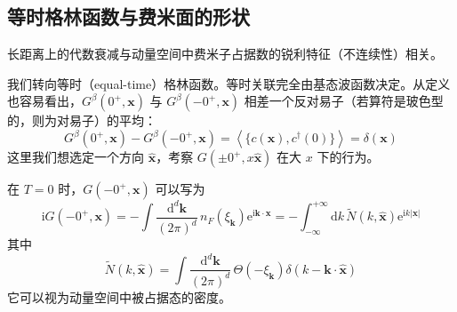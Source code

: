 \subsection{等时格林函数与费米面的形状}

\begin{keypoints}
\item 长距离上的代数衰减与动量空间中费米子占据数的锐利特征（不连续性）相关。
\end{keypoints}

我们转向等时（equal-time）格林函数。等时关联完全由基态波函数决定。从定义也容易看出，$G^{\beta}(0^{+},\pmb{x})$ 与 $G^{\beta}(-0^{+},\pmb{x})$ 相差一个反对易子（若算符是玻色型的，则为对易子）的平均：
\begin{equation*}
G^{\beta}(0^{+},\pmb{x}) - G^{\beta}(-0^{+},\pmb{x}) = \left\langle \{c(\pmb{x}), c^{\dagger}(0)\}\right\rangle = \delta(\pmb{x})
\end{equation*}
这里我们想选定一个方向 $\hat{\pmb{x}}$，考察 $G(\pm 0^{+}, x\hat{\pmb{x}})$ 在大 $x$ 下的行为。

在 $T = 0$ 时，$G(-0^{+},\pmb{x})$ 可以写为
\begin{equation*}
\mathrm{i}G(-0^{+},\pmb{x}) = -\int \frac{\mathrm{d}^{d}\pmb{k}}{(2\pi)^{d}}\, n_{F}(\xi_{\pmb{k}})\mathrm{e}^{\mathrm{i}\pmb{k}\cdot\pmb{x}} = -\int_{-\infty}^{+\infty}\mathrm{d}k\, \tilde{N}(k,\hat{\pmb{x}})\mathrm{e}^{\mathrm{i}k|\pmb{x}|}
\end{equation*}
其中
\begin{equation*}
\tilde{N}(k,\hat{\pmb{x}}) = \int \frac{\mathrm{d}^{d}\pmb{k}}{(2\pi)^{d}}\,\Theta(-\xi_{\pmb{k}})\delta(k - \pmb{k}\cdot\hat{\pmb{x}})
\end{equation*}
它可以视为动量空间中被占据态的密度。



